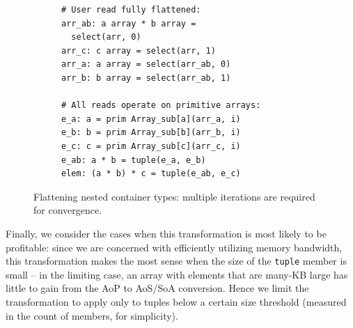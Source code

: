 \begin{figure}[htbp]
\begin{minipage}[t]{0.48\textwidth}
\begin{subfigure}[t]{\linewidth}
\begin{verbatim}
# User read fully flattened:
arr_ab: a array * b array =
  select(arr, 0)
arr_c: c array = select(arr, 1)
arr_a: a array = select(arr_ab, 0)
arr_b: b array = select(arr_ab, 1)

# All reads operate on primitive arrays:
e_a: a = prim Array_sub[a](arr_a, i)
e_b: b = prim Array_sub[b](arr_b, i)
e_c: c = prim Array_sub[c](arr_c, i)
e_ab: a * b = tuple(e_a, e_b)
elem: (a * b) * c = tuple(e_ab, e_c)
\end{verbatim}
    \end{subfigure}
    \end{minipage}

    \caption{Flattening nested container types: multiple iterations are required
  for convergence.}

  \label{fig:shallow_needs_repeated}
\end{figure}

Finally, we consider the cases when this transformation is most likely to be
profitable: since we are concerned with efficiently utilizing memory bandwidth,
this transformation makes the most sense when the size of the \texttt{tuple}
member is small -- in the limiting case, an array with elements that are many-KB
large has little to gain from the AoP to AoS/SoA conversion. Hence we limit the
transformation to apply only to tuples below a certain size threshold (measured
in the count of members, for simplicity).




